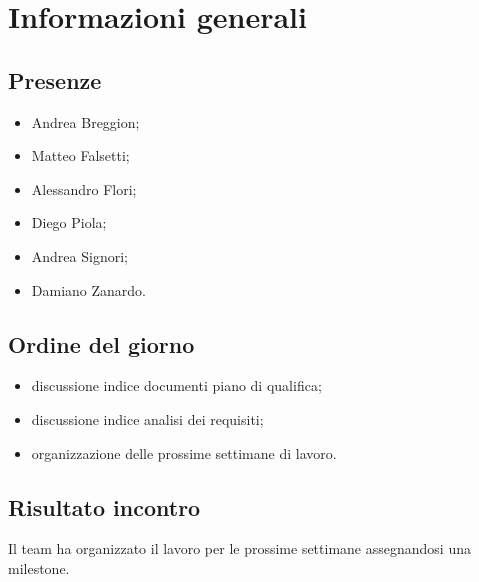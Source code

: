 \section{Informazioni generali}
    \def\modifiche { 
        {Data, 2020-12-16},
        {Ora inizio, 16:10},
        {Ora fine, 17:45},
        {Luogo, Discord},
    }
    

\subsection{Presenze}
\begin{itemize}
    \item Andrea Breggion;
    \item Matteo Falsetti;
    \item Alessandro Flori;
    \item Diego Piola;
    \item Andrea Signori;
    \item Damiano Zanardo.
\end{itemize}
\subsection{Ordine del giorno}
\begin{itemize}
    \item discussione indice documenti piano di qualifica;
    \item discussione indice analisi dei requisiti;
    \item organizzazione delle prossime settimane di lavoro.
\end{itemize}

\subsection{Risultato incontro}
    Il team ha organizzato il lavoro per le prossime settimane assegnandosi una
	milestone.   